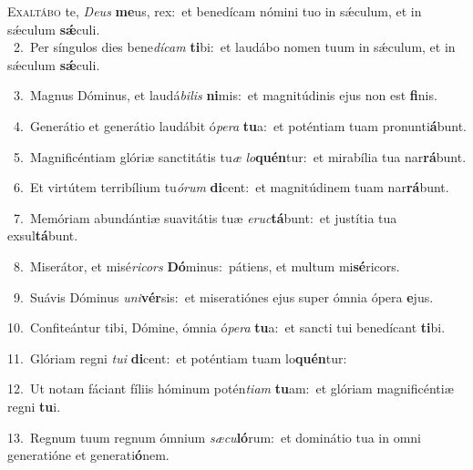 \lettrine{\initial\textcolor{\initialcolor}{E}}{xaltábo} te, \textit{De}\-\textit{us} \textbf{me}\-us, rex:~\star et benedícam nómini tuo in sǽculum, et in sǽculum \textbf{sǽ}\-culi.\\
{\numbfont\textcolor{\numbcolor}{~2.}}~Per síngulos dies bene\-\textit{dí}\-\textit{cam} \textbf{ti}\-bi:~\star et laudábo nomen tuum in sǽculum, et in sǽculum \textbf{sǽ}\-culi.\par
{\numbfont\textcolor{\numbcolor}{~3.}}~Magnus Dóminus, et laudá\-\textit{bi}\-\textit{lis} \textbf{ni}\-mis:~\star et magnitúdinis ejus non est \textbf{fi}\-nis.\par
{\numbfont\textcolor{\numbcolor}{~4.}}~Generátio et generátio laudábit ó\-\textit{pe}\-\textit{ra} \textbf{tu}\-a:~\star et poténtiam tuam pronunti\-\textbf{á}\-bunt.\par
{\numbfont\textcolor{\numbcolor}{~5.}}~Magnificéntiam glóriæ sanctitátis tu\textit{æ} \textit{lo}\-\textbf{quén}tur:~\star et mirabília tua nar\-\textbf{rá}\-bunt.\par
{\numbfont\textcolor{\numbcolor}{~6.}}~Et virtútem terribílium tu\-\textit{ó}\-\textit{rum} \textbf{di}\-cent:~\star et magnitúdinem tuam nar\-\textbf{rá}\-bunt.\par
{\numbfont\textcolor{\numbcolor}{~7.}}~Memóriam abundántiæ suavitátis tuæ \textit{e}\-\textit{ruc}\textbf{tá}bunt:~\star et justítia tua exsul\-\textbf{tá}\-bunt.\par
{\numbfont\textcolor{\numbcolor}{~8.}}~Miserátor, et misé\-\textit{ri}\-\textit{cors} \textbf{Dó}\-minus:~\star pátiens, et multum mi\-\textbf{sé}\-ricors.\par
{\numbfont\textcolor{\numbcolor}{~9.}}~Suávis Dóminus \textit{u}\-\textit{ni}\textbf{vér}sis:~\star et miseratiónes ejus super ómnia ópera \textbf{e}\-jus.\par
{\numbfont\textcolor{\numbcolor}{10.}}~Confiteántur tibi, Dómine, ómnia ó\-\textit{pe}\-\textit{ra} \textbf{tu}\-a:~\star et sancti tui benedícant \textbf{ti}\-bi.\par
{\numbfont\textcolor{\numbcolor}{11.}}~Glóriam regni \textit{tu}\-\textit{i} \textbf{di}\-cent:~\star et poténtiam tuam lo\-\textbf{quén}\-tur:\par
{\numbfont\textcolor{\numbcolor}{12.}}~Ut notam fáciant fíliis hóminum potén\-\textit{ti}\-\textit{am} \textbf{tu}\-am:~\star et glóriam magnificéntiæ regni \textbf{tu}\-i.\par
{\numbfont\textcolor{\numbcolor}{13.}}~Regnum tuum regnum ómnium \textit{sæ}\-\textit{cu}\textbf{ló}rum:~\star et dominátio tua in omni generatióne et generati\-\textbf{ó}\-nem.\par
